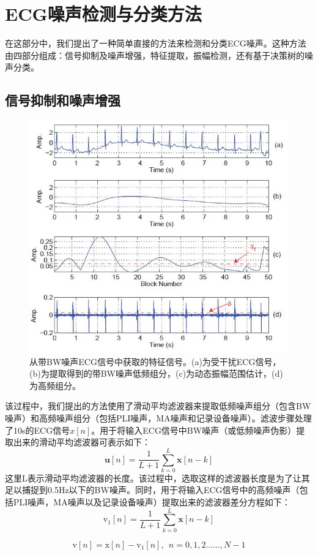 \section{ECG噪声检测与分类方法}
在这部分中，我们提出了一种简单直接的方法来检测和分类ECG噪声。这种方法由四部分组成：信号抑制及噪声增强，特征提取，振幅检测，还有基于决策树的噪声分类。

\subsection{信号抑制和噪声增强}

\begin{figure}%
\label{figNo.2}
\setlength{\belowcaptionskip}{-10pt}
\setlength{\abovecaptionskip}{5pt}
\includegraphics[width=0.55\columnwidth]{fig2.jpg}
\caption{
\wuhao
从带BW噪声ECG信号中获取的特征信号。(a)为受干扰ECG信号，(b)为提取得到的带BW噪声低频组分，(c)为动态振幅范围估计，(d)为高频组分。
}
\end{figure}
\song
该过程中，我们提出的方法使用了滑动平均滤波器来提取低频噪声组分（包含BW噪声）和高频噪声组分（包括PLI噪声，MA噪声和记录设备噪声）。滤波步骤处理了10s的ECG信号$x[n]$。用于将输入ECG信号中BW噪声（或低频噪声伪影）提取出来的滑动平均滤波器可表示如下：
\begin{equation}
  \mathbf{u}[n]=\frac{1}{L+1}\sum^{L}_{k=0}\mathbf{x}[n-k]
  \label{equ1}
\end{equation}
这里L表示滑动平均滤波器的长度。该过程中，选取这样的滤波器长度是为了让其足以捕捉到0.5Hz以下的BW噪声。同时，用于将输入ECG信号中的高频噪声（包括PLI噪声，MA噪声以及记录设备噪声）提取出来的滤波器差分方程如下：
\begin{equation}
  \mathrm{v_{1}}[n]=\frac{1}{L+1}\sum^{L}_{k=0}\mathbf{x}[n-k]
  \label{equ2}
\end{equation}

\begin{equation}
  \mathrm{v}[n]=\mathrm{x}[n]-\mathrm{v_{1}}[n],~~n=0,1,2......,N-1 
\label{equ3}
\end{equation}

